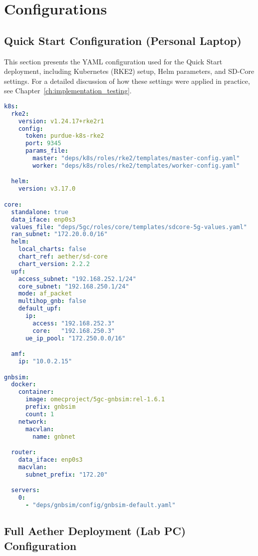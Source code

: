\appendix
\renewcommand{\chaptername}{Appendix}
\chapter{Configurations}
\section{Quick Start Configuration (Personal
Laptop)}
\label{sec:quickstart-config}

This section presents the YAML configuration used for the Quick Start deployment,
including Kubernetes (RKE2) setup, Helm parameters, and SD-Core settings.
For a detailed discussion of how these settings were applied in practice,
see Chapter~\ref{ch:implementation_testing}.

\begin{lstlisting}[language=yaml, 
  caption={Quick Start deployment configuration},
  label={lst:quickstart-config}]
k8s:
  rke2:
    version: v1.24.17+rke2r1
    config:
      token: purdue-k8s-rke2
      port: 9345
      params_file:
        master: "deps/k8s/roles/rke2/templates/master-config.yaml"
        worker: "deps/k8s/roles/rke2/templates/worker-config.yaml"

  helm:
    version: v3.17.0

core:
  standalone: true
  data_iface: enp0s3
  values_file: "deps/5gc/roles/core/templates/sdcore-5g-values.yaml"
  ran_subnet: "172.20.0.0/16"
  helm:
    local_charts: false
    chart_ref: aether/sd-core
    chart_version: 2.2.2
  upf:
    access_subnet: "192.168.252.1/24"
    core_subnet: "192.168.250.1/24"
    mode: af_packet
    multihop_gnb: false
    default_upf:
      ip:
        access: "192.168.252.3"
        core:   "192.168.250.3"
      ue_ip_pool: "172.250.0.0/16"

  amf:
    ip: "10.0.2.15"

gnbsim:
  docker:
    container:
      image: omecproject/5gc-gnbsim:rel-1.6.1
      prefix: gnbsim
      count: 1
    network:
      macvlan:
        name: gnbnet

  router:
    data_iface: enp0s3
    macvlan:
      subnet_prefix: "172.20"

  servers:
    0:
      - "deps/gnbsim/config/gnbsim-default.yaml"

\end{lstlisting}

\section{Full Aether Deployment (Lab PC) Configuration}
\label{sec:labpc-config}

